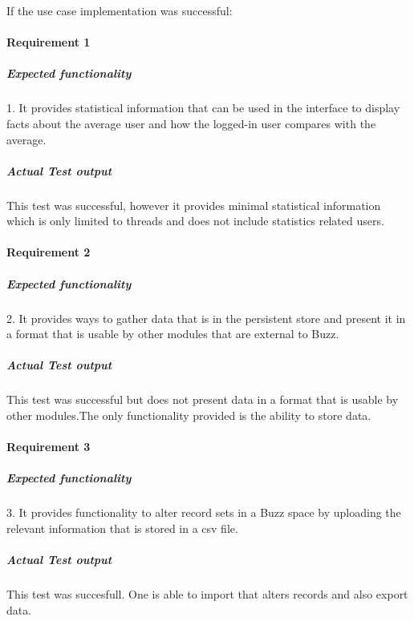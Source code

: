 If the use case implementation was successful:
\paragraph{Requirement 1}
	\subparagraph{Expected functionality}
	1. It provides statistical information that can be used in the interface to display facts about the average user and how the logged-in user compares with the average.
	\subparagraph{Actual Test output}
	This test was successful, however it provides minimal statistical  information which is only limited to threads and does not include statistics related users.

\paragraph{Requirement 2}
	\subparagraph{Expected functionality}
2. It provides ways to gather data that is in the persistent store and present it in a format that
is usable by other modules that are external to Buzz.
\subparagraph{Actual Test output}
	This test was successful but does not present data in a format that is usable by other modules.The only functionality
	provided is the ability to store data.

\paragraph{Requirement 3}
	\subparagraph{Expected functionality}
3. It provides functionality to alter record sets in a Buzz space by uploading the relevant information that is stored in a csv file.
	\subparagraph{Actual Test output}
This test was succesfull. One is able to import that alters records and also export data.
	
